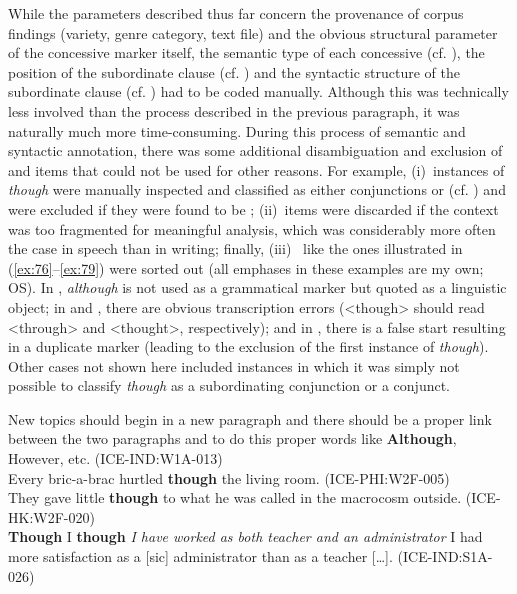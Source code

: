   While the parameters described thus far concern the provenance of corpus findings (variety, genre category, text file) and the obvious structural parameter of the concessive marker itself, the semantic type of each concessive (cf. ), the position of the subordinate clause (cf. ) and the syntactic structure of the subordinate clause (cf. ) had to be coded manually. Although this was technically less involved than the process described in the previous paragraph, it was naturally much more time-consuming. During this process of semantic and syntactic annotation, there was some additional disambiguation and exclusion of  and items that could not be used for other reasons. For example,
(i)~instances of \textit{though} were manually inspected and classified as either conjunctions or  (cf. \citealt{Schützler2020a}) and were excluded if they were found to be ;
(ii)~items were discarded if the context was too fragmented for meaningful analysis, which was considerably more often the case in speech than in writing; finally,
(iii)~ like the ones illustrated in (\ref{ex:76}–\ref{ex:79}) were sorted out (all emphases in these examples are my own; OS). In , \textit{although} is not used as a grammatical marker but quoted as a linguistic object; in  and , there are obvious transcription errors (<though> should read <through> and <thought>, respectively); and in , there is a false start resulting in a duplicate marker (leading to the exclusion of the first instance of \textit{though}). Other cases not shown here included instances in which it was simply not possible to classify \textit{though} as a subordinating conjunction or a conjunct.

\ea\label{ex:76}\label{bkm:Ref466970222}New topics should begin in a new paragraph and there should be a proper link between the two paragraphs and to do this proper words like \textbf{Although}, However, etc. (ICE-IND:W1A-013)\\
    \ex\label{ex:77}\label{bkm:Ref466970225}Every bric-a-brac hurtled \textbf{though} the living room. (ICE-PHI:W2F-005)\\
    \ex\label{ex:78}\label{bkm:Ref466970277}They gave little \textbf{though} to what he was called in the macrocosm outside. (ICE-HK:W2F-020)\\
    \ex\label{ex:79}\label{bkm:Ref466970288}\textbf{Though} I \textbf{though} \textit{I have worked as both teacher and an administrator} I had more satisfaction as a [sic] administrator than as a teacher […]. (ICE-IND:S1A-026)\\
\z

